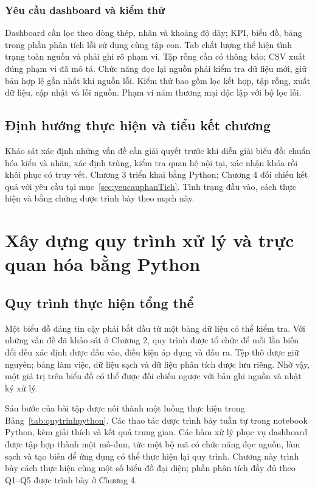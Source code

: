\documentclass[12pt,a4paper,oneside]{report}
\begin{document}
\subsection{Yêu cầu dashboard và kiểm thử}

Dashboard cần lọc theo dòng thép, nhãn và khoảng độ dày; KPI, biểu đồ, bảng trong phần phân tích lỗi sử dụng cùng tập con. Tab chất lượng thể hiện tình trạng toàn nguồn và phải ghi rõ phạm vi. Tập rỗng cần có thông báo; CSV xuất đúng phạm vi đã mô tả. Chức năng đọc lại nguồn phải kiểm tra dữ liệu mới, giữ bản hợp lệ gần nhất khi nguồn lỗi. Kiểm thử bao gồm lọc kết hợp, tập rỗng, xuất dữ liệu, cập nhật và lỗi nguồn. Phạm vi năm thương mại độc lập với bộ lọc lỗi.

\section{Định hướng thực hiện và tiểu kết chương}

Khảo sát xác định những vấn đề cần giải quyết trước khi diễn giải biểu đồ: chuẩn hóa kiểu và nhãn, xác định trùng, kiểm tra quan hệ nội tại, xác nhận khóa rồi khôi phục có truy vết. Chương 3 triển khai bằng Python; Chương 4 đối chiếu kết quả với yêu cầu tại mục~\ref{sec:yeucauphanTich}. Tình trạng đầu vào, cách thực hiện và bằng chứng được trình bày theo mạch này.
\chapter{Xây dựng quy trình xử lý và trực quan hóa bằng Python}
\label{chap:thuchien}

\section{Quy trình thực hiện tổng thể}

Một biểu đồ đáng tin cậy phải bắt đầu từ một bảng dữ liệu có thể kiểm tra. Với những vấn đề đã khảo sát ở Chương 2, quy trình được tổ chức để mỗi lần biến đổi đều xác định được đầu vào, điều kiện áp dụng và đầu ra. Tệp thô được giữ nguyên; bảng làm việc, dữ liệu sạch và dữ liệu phân tích được lưu riêng. Nhờ vậy, một giá trị trên biểu đồ có thể được đối chiếu ngược với bản ghi nguồn và nhật ký xử lý.

Sáu bước của bài tập được nối thành một luồng thực hiện trong Bảng~\ref{tab:quytrinhpython}. Các thao tác được trình bày tuần tự trong notebook Python, kèm giải thích và kết quả trung gian. Các hàm xử lý phục vụ dashboard được tập hợp thành một mô-đun, tức một bộ mã có chức năng đọc nguồn, làm sạch và tạo biến để ứng dụng có thể thực hiện lại quy trình. Chương này trình bày cách thực hiện cùng một số biểu đồ đại diện; phần phân tích đầy đủ theo Q1--Q5 được trình bày ở Chương 4.
\end{document}
